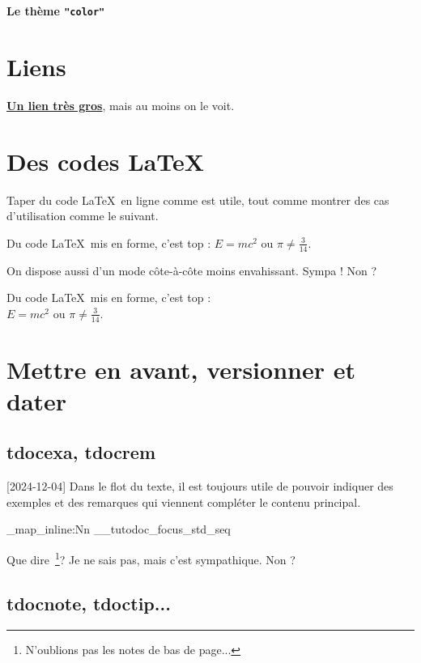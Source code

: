 \documentclass[theme = color]{tutodoc}
\newcommand\thisstyle{color}
\newcommand\myexrmktext{
    \tdocversion{1.7.0}[2024-12-04]
    Dans le flot du texte, il est toujours utile de pouvoir indiquer des exemples et des remarques qui viennent compléter le contenu principal.
}
\newcommand\myhighlightedtext{
    Que dire\,%
    \footnote{
        N'oublions pas les notes de bas de page...
    }?
    Je ne sais pas, mais c'est sympathique. Non ?
}
\begin{document}
\textsf{\Huge\bfseries Le thème \texttt{"\thisstyle"}}

\section{Liens}

{\Large\bfseries \href{https://github.com/bc-tools/for-latex/tree/main/tutodoc}{Un lien très gros}}, mais au moins on le voit.



\section{Des codes \LaTeX}

Taper du code \LaTeX\ en ligne comme  est utile, tout comme montrer des cas d'utilisation comme le suivant.

\begin{tdoclatex}
Du code \LaTeX\ mis en forme, c'est top : $E = m c^2$ ou $\pi \neq \frac{3}{14}$.
\end{tdoclatex}


On dispose aussi d'un mode côte-à-côte moins envahissant. Sympa ! Non ?

\begin{tdoclatex}[sbs]
Du code \LaTeX\ mis en forme, c'est top : \\
$E = m c^2$ ou $\pi \neq \frac{3}{14}$.
\end{tdoclatex}



\section{Mettre en avant, versionner et dater}

\subsection{tdocexa, tdocrem}

\myexrmktext

\ExplSyntaxOn

\seq_map_inline:Nn \g__tutodoc_focus_std_seq {
    \begin{tdoc#1}
        \myhighlightedtext
    \end{tdoc#1}
}

\ExplSyntaxOff



\subsection{tdocnote, tdoctip...}
\end{document}
